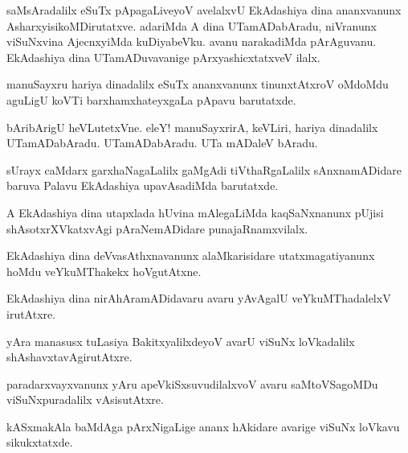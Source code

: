 \begin{mng}
saMsAradalilx eSuTx pApagaLiveyoV avelalxvU EkAdashiya dina ananxvanunx AsharxyisikoMDirutatxve. adariMda A dina UTamADabAradu, niVranunx viSuNxvina AjecnxyiMda kuDiyabeVku. avanu narakadiMda pArAguvanu. EkAdashiya dina UTamADuvavanige pArxyashicxtatxveV ilalx.
\end{mng}

\begin{mng}
manuSayxru hariya dinadalilx eSuTx ananxvanunx tinunxtAtxroV oMdoMdu aguLigU koVTi barxhamxhateyxgaLa pApavu barutatxde.
\end{mng}

\begin{mng}
bAribArigU heVLutetxVne. eleY! manuSayxrirA, keVLiri, hariya dinadalilx UTamADabAradu. UTamADabAradu. UTa mADaleV bAradu.
\end{mng}

\begin{mng}
sUrayx caMdarx garxhaNagaLalilx gaMgAdi tiVthaRgaLalilx sAnxnamADidare baruva Palavu EkAdashiya upavAsadiMda barutatxde.
\end{mng}

\begin{mng}
A EkAdashiya dina utapxlada hUvina mAlegaLiMda kaqSaNxnanunx pUjisi shAsotxrXVkatxvAgi pAraNemADidare punajaRnamxvilalx.
\end{mng}

\begin{mng}
EkAdashiya dina deVvasAthxnavanunx alaMkarisidare utatxmagatiyanunx hoMdu veYkuMThakekx hoVgutAtxne.
\end{mng}

\begin{mng}
EkAdashiya dina nirAhAramADidavaru avaru yAvAgalU veYkuMThadalelxV irutAtxre.
\end{mng}

\begin{mng}
yAra manasusx tuLasiya BakitxyalilxdeyoV avarU viSuNx loVkadalilx shAshavxtavAgirutAtxre.
\end{mng}

\begin{mng}
paradarxvayxvanunx yAru apeVkiSxsuvudilalxvoV avaru saMtoVSagoMDu viSuNxpuradalilx vAsisutAtxre.
\end{mng}

\begin{mng}
kASxmakAla baMdAga pArxNigaLige ananx hAkidare avarige viSuNx loVkavu sikukxtatxde.
\end{mng}

